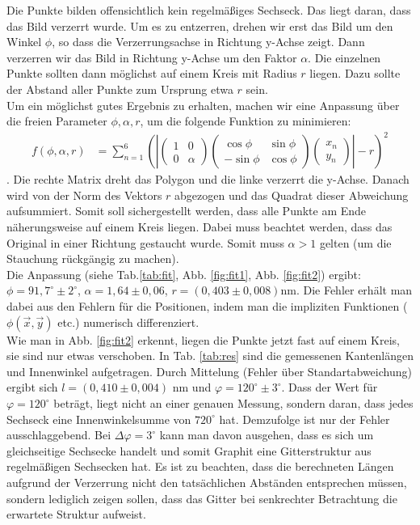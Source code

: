 Die Punkte bilden offensichtlich kein regelmäßiges Sechseck. Das liegt daran, dass das Bild verzerrt wurde. Um es zu entzerren, drehen wir erst das Bild um den Winkel $\phi$, so dass die Verzerrungsachse in Richtung y-Achse zeigt. Dann verzerren wir das Bild in Richtung y-Achse um den Faktor $\alpha$. Die einzelnen Punkte sollten dann möglichst auf einem Kreis mit Radius $r$ liegen. Dazu sollte der Abstand aller Punkte zum Ursprung etwa $r$ sein.\\

Um ein möglichst gutes Ergebnis zu erhalten, machen wir eine Anpassung über die freien Parameter $\phi, \alpha, r$, um die folgende Funktion zu minimieren:
\begin{align*}
f(\phi,\alpha,r) &= \sum\limits_{n = 1}^6 \left(\left|
\begin{pmatrix}
1 & 0\\
0 & \alpha
\end{pmatrix}
\begin{pmatrix}
\cos{\phi} & \sin{\phi}\\
-\sin{\phi} & \cos{\phi}
\end{pmatrix}
\begin{pmatrix}
x_n\\
y_n
\end{pmatrix}
  \right| - r\right)^2
\end{align*}.
Die rechte Matrix dreht das Polygon und die linke verzerrt die y-Achse. Danach wird von der Norm des Vektors $r$ abgezogen und das Quadrat dieser Abweichung aufsummiert. Somit soll sichergestellt werden, dass alle Punkte am Ende näherungsweise auf einem Kreis liegen. Dabei muss beachtet werden, dass das Original in einer Richtung gestaucht wurde. Somit muss $\alpha > 1$ gelten (um die Stauchung rückgängig zu machen).\\
Die Anpassung (siehe Tab.\ref{tab:fit}, Abb. \ref{fig:fit1}, Abb. \ref{fig:fit2}) ergibt: $\phi = 91,7^\circ \pm 2^\circ$, $\alpha = 1,64 \pm 0,06$, $r = (0,403 \pm 0,008)\si{\nano\metre}$. Die Fehler erhält man dabei aus den Fehlern für die Positionen, indem man die impliziten Funktionen ($\phi(\vec{x},\vec{y})$ etc.) numerisch differenziert.  \\ 

Wie man in Abb. \ref{fig:fit2} erkennt, liegen die Punkte jetzt fast auf einem Kreis, sie sind nur etwas verschoben. In Tab. \ref{tab:res} sind die gemessenen Kantenlängen und Innenwinkel aufgetragen. Durch Mittelung (Fehler über Standartabweichung) ergibt sich $l = (0,410 \pm 0,004)$ nm und $\varphi = 120^\circ \pm 3^\circ$. Dass der Wert für $\varphi = 120^\circ$ beträgt, liegt nicht an einer genauen Messung, sondern daran, dass jedes Sechseck eine Innenwinkelsumme von $720^\circ$ hat. Demzufolge ist nur der Fehler ausschlaggebend. Bei $\Delta\varphi=3^\circ$ kann man davon ausgehen, dass es sich um gleichseitige Sechsecke handelt und somit Graphit eine Gitterstruktur aus regelmäßigen Sechsecken hat. Es ist zu beachten, dass die berechneten Längen aufgrund der Verzerrung nicht den tatsächlichen Abständen entsprechen müssen, sondern lediglich zeigen sollen, dass das Gitter bei senkrechter Betrachtung die erwartete Struktur aufweist.

